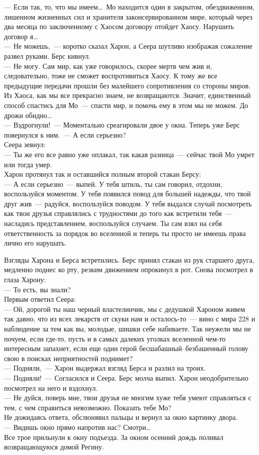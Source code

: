 --- Если так, то, что мы имеем\ldots\ Мо находится один в закрытом, 
обездвиженном, лишенном жизненных сил и хранителя законсервированном мире, который через два 
месяца по заключенному с Хаосом договору отойдет Хаосу. Нарушить договор я\ldots\\
--- Не можешь,~--- коротко сказал Харон, а Сеера шутливо изображая сожаление 
развел руками. Берс кивнул.\\
--- Не могу. Сам мир, как уже говорилось, скорее мертв чем жив и, следовательно, 
тоже не сможет воспротивиться Хаосу. К тому же все предыдущие передачи прошли 
без малейшего сопротивления со стороны миров. Из Хаоса, как мы все прекрасно 
знаем, не возвращаются. Значит, единственный способ спастись для Мо~--- спасти 
мир, и помочь ему в этом мы не можем. До дрожи обидно\ldots\\
--- Вздрогнули!~--- Моментально среагировали двое у окна. Теперь уже Берс 
повернулся к ним.~--- А если серьезно?\\
Сеера зевнул:\\
--- Ты же его все равно уже оплакал, так какая разница~--- сейчас твой Мо умрет 
или тогда умер.\\
Харон протянул так и оставшийся полным второй стакан Берсу:\\
--- А если серьезно~--- выпей. У тебя штиль, ты сам говорил, отдохни, 
воспользуйся 
моментом. У тебя появился повод для большей надежды, что твой друг жив~--- 
радуйся, воспользуйся поводом. У тебя выдался случай посмотреть как твои друзья 
справлялись с трудностями до того как встретили тебя~--- насладись 
представлением, 
воспользуйся случаем. Ты сам взял на себя ответственность за порядок во 
вселенной и теперь ты просто не имеешь права лично его нарушать.

Взгляды Харона и Берса встретились. Берс принял стакан из рук старшего друга, 
медленно поднес ко рту, резким движением опрокинул в рот. Снова посмотрел в 
глаза Харону:\\
--- То есть, вы знали?\\
Первым ответил Сеера:\\
--- Ой, дорогой ты наш черный властелинчик, мы с дедушкой Хароном живем так 
давно, что из всех лекарств от скуки нам и осталось-то~--- вино с мира 228 и 
наблюдение за тем как вы, молодые, шишки себе набиваете. Так неужели мы не почуем, если 
где-то, пусть и в самых далеких уголках вселенной чем-то интересным запахнет, 
если еще один герой бесшабашный--безбашенный голову свою в поисках неприятностей 
поднимет?\\
--- Подняли,~--- Харон выдержал взгляд Берса и разлил на троих.\\
--- Подняли!~--- Согласился и Сеера. Берс молча выпил. Харон неодобрительно 
посмотрел на него и вздохнул.\\
--- Не дуйся, поверь мне, твои друзья не многим хуже тебя умеют справляться с 
тем, с чем справиться невозможно. Показать тебе Мо?\\
Не дожидаясь ответа, обслюнявил пальцы и вернул за окно картинку двора.\\
--- Видишь окно прямо напротив нас? Смотри\ldots\\
Все трое прильнули к окну подъезда. За окном осенний дождь поливал 
возвращающуюся домой Регину. 

